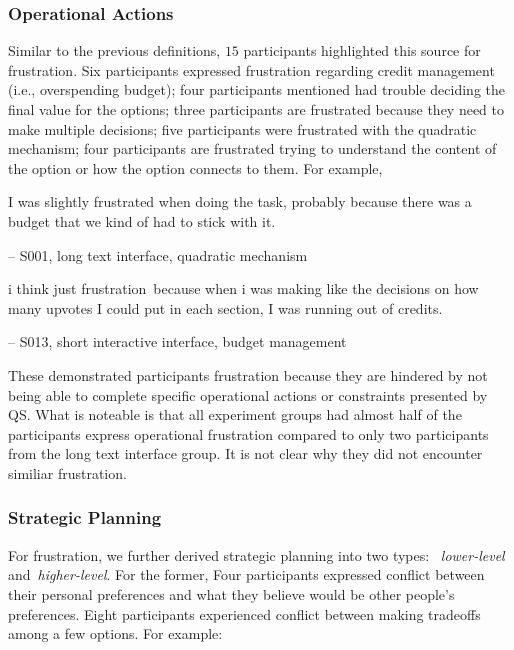 \subsubsection{Operational Actions} Similar to the previous definitions, $15$ participants highlighted this source for frustration. Six participants expressed frustration regarding credit management (i.e., overspending budget); four participants mentioned had trouble deciding the final value for the options; three participants are frustrated because they need to make multiple decisions; five participants were frustrated with the quadratic mechanism; four participants are frustrated trying to understand the content of the option or how the option connects to them. For example, 

\begin{displayquote}
I was slightly frustrated when doing the task, probably because there was a budget that we kind of had to stick with it.

\noindent \hfill -- S001, long text interface, quadratic mechanism
\end{displayquote}

\begin{displayquote}
i think just frustration~\bracketellipsis because when i was making like the decisions on how many upvotes I could put in each section, I was running out of credits.

\noindent \hfill -- S013, short interactive interface, budget management
\end{displayquote}

These demonstrated participants frustration because they are hindered by not being able to complete specific operational actions or constraints presented by QS. What is noteable is that all experiment groups had almost half of the participants express operational frustration compared to only two participants from the long text interface group. It is not clear why they did not encounter similiar frustration.

\subsubsection{Strategic Planning} For frustration, we further derived strategic planning into two types: ~\textit{lower-level} and~\textit{higher-level}. For the former, Four participants expressed conflict between their personal preferences and what they believe would be other people's preferences. Eight participants experienced conflict between making tradeoffs among a few options. For example:

